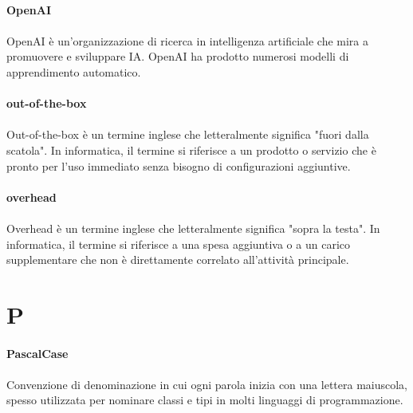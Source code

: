 \documentclass[10pt, a4paper]{article}
\begin{document}
\vspace{2em}
\paragraph{OpenAI}\noindent\hrulefill
\paragraph{}OpenAI è un'organizzazione di ricerca in intelligenza artificiale che mira a promuovere e sviluppare IA. OpenAI ha prodotto numerosi modelli di apprendimento automatico.

\vspace{2em}
\paragraph{out-of-the-box}\noindent\hrulefill
\paragraph{}Out-of-the-box è un termine inglese che letteralmente significa "fuori dalla scatola". In informatica, il termine si riferisce a un prodotto o servizio che è pronto per l'uso immediato senza bisogno di configurazioni aggiuntive.

\vspace{2em}
\paragraph{overhead}\noindent\hrulefill
\paragraph{}Overhead è un termine inglese che letteralmente significa "sopra la testa". In informatica, il termine si riferisce a una spesa aggiuntiva o a un carico supplementare che non è direttamente correlato all'attività principale.

\newpage
\section{P}

\vspace{2em}
\paragraph{PascalCase}\noindent\hrulefill
\paragraph{}Convenzione di denominazione in cui ogni parola inizia con una lettera maiuscola, spesso utilizzata per nominare classi e tipi in molti linguaggi di programmazione.
\end{document}
